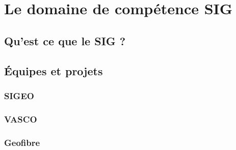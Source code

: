 \chapter{Le domaine de compétence SIG}
\section{Qu'est ce que le SIG ?}
\section{\'Equipes et projets}
\subsection{SIGEO}
\subsection{VASCO}
\subsection{Geofibre}
